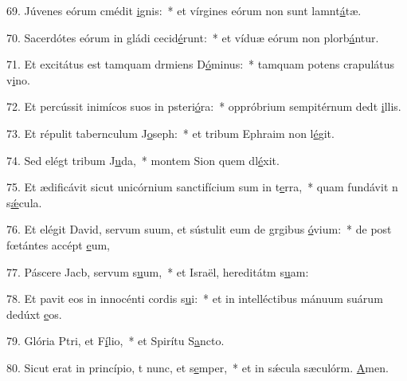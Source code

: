 69. Júvenes eórum cmédit \uline{i}gnis:~* et vírgines eórum non sunt lamnt\uline{á}tæ.\par 
70. Sacerdótes eórum in gládi cecid\uline{é}runt:~* et víduæ eórum non plorb\uline{á}ntur.\par 
71. Et excitátus est tamquam drmiens D\uline{ó}minus:~* tamquam potens crapulátus  v\uline{i}no.\par 
72. Et percússit inimícos suos in psteri\uline{ó}ra:~* oppróbrium sempitérnum dedt \uline{i}llis.\par 
73. Et répulit tabernculum J\uline{o}seph:~* et tribum Ephraim non l\uline{é}git.\par 
74. Sed elégt tribum J\uline{u}da,~* montem Sion quem dl\uline{é}xit.\par 
75. Et ædificávit sicut unicórnium sanctifícium sum in t\uline{e}rra,~* quam fundávit n s\uline{ǽ}cula.\par 
76. Et elégit David, servum suum, et sústulit eum de grgibus \uline{ó}vium:~* de post fœtántes accépt \uline{e}um,\par 
77. Páscere Jacb, servum s\uline{u}um,~* et Israël, hereditátm s\uline{u}am:\par 
78. Et pavit eos in innocénti cordis s\uline{u}i:~* et in intelléctibus mánuum suárum dedúxt \uline{e}os.\par 
79. Glória Ptri, et F\uline{í}lio,~* et Spirítu S\uline{a}ncto.\par 
80. Sicut erat in princípio, t nunc, et s\uline{e}mper,~* et in sǽcula sæculórm. \uline{A}men.\par 
